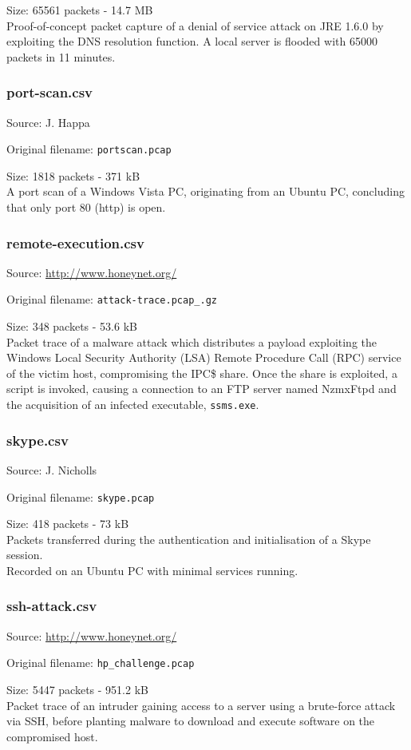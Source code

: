 \documentclass[12pt,a4paper]{article}
\newcommand{\dbl}{\\[\baselineskip]}
\begin{document}
	Size: 65561 packets - 14.7 MB \dbl
	Proof-of-concept packet capture of a denial of service
	attack on JRE 1.6.0 by exploiting the DNS resolution
	function. A local server is flooded with 65000 packets in
	11 minutes.
	
	\subsubsection*{port-scan.csv}
	Source: J. Happa
	
	Original filename: \verb!portscan.pcap!
	
	Size: 1818 packets - 371 kB \dbl
	A port scan of a Windows Vista PC, originating from an
	Ubuntu PC, concluding that only port 80 (http) is open.
	
	\subsubsection*{remote-execution.csv}
	Source: \url{http://www.honeynet.org/}
	
	Original filename: \verb!attack-trace.pcap_.gz!
	
	Size: 348 packets - 53.6 kB\dbl
	Packet trace of a malware attack which distributes a
	payload exploiting the Windows Local Security Authority
	(LSA) Remote Procedure Call (RPC) service of the victim
	host, compromising the IPC\$ share. Once the share is
	exploited, a script is invoked, causing a connection to an
	FTP server named NzmxFtpd and the acquisition of an
	infected executable, \verb!ssms.exe!.
	
	\subsubsection*{skype.csv}
	Source: J. Nicholls
	
	Original filename: \verb|skype.pcap|
	
	Size: 418 packets - 73 kB\dbl
	Packets transferred during the authentication and
	initialisation of a Skype session.\\ Recorded on an Ubuntu
	PC with minimal services running.
	
	\subsubsection*{ssh-attack.csv}
	Source: \url{http://www.honeynet.org/}
	
	Original filename: \verb|hp_challenge.pcap|
	
	Size: 5447 packets - 951.2 kB\dbl
	Packet trace of an intruder gaining access to a server
	using a brute-force attack via SSH, before planting malware
	to download and execute software on the compromised host.
	
\end{document}
